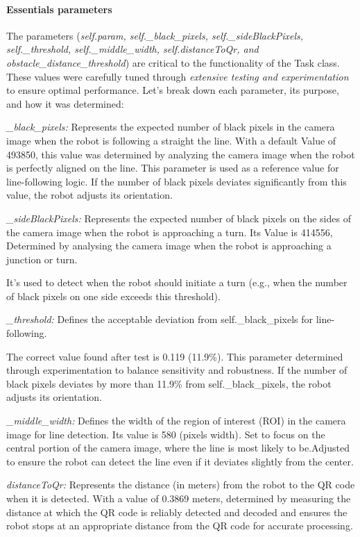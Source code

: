 \documentclass[a4paper,12pt]{extreport}
\begin{document}
\newpage

\paragraph{Essentials parameters}

The parameters (\emph{self.param, self.\_black\_pixels,
self.\_sideBlackPixels, self.\_threshold, self.\_middle\_width,
self.distanceToQr, and obstacle\_distance\_threshold}) are critical to
the functionality of the Task class. These values were carefully tuned
through \emph{extensive testing and experimentation} to ensure optimal
performance. Let's break down each parameter, its purpose, and how it
was determined:

\emph{\_black\_pixels:} Represents the expected number of black pixels
in the camera image when the robot is following a straight the line.
With a default Value of 493850, this value was determined by analyzing
the camera image when the robot is perfectly aligned on the line. This
parameter is used as a reference value for line-following logic. If the
number of black pixels deviates significantly from this value, the robot
adjusts its orientation.

\emph{\_sideBlackPixels:} Represents the expected number of black pixels
on the sides of the camera image when the robot is approaching a turn.
Its Value is 414556, Determined by analysing the camera image when the
robot is approaching a junction or turn.

It's used to detect when the robot should initiate a turn (e.g., when
the number of black pixels on one side exceeds this threshold).

\emph{\_threshold:} Defines the acceptable deviation from
self.\_black\_pixels for line-following.

The correct value found after test is 0.119 (11.9\%). This parameter
determined through experimentation to balance sensitivity and
robustness. If the number of black pixels deviates by more than 11.9\%
from self.\_black\_pixels, the robot adjusts its orientation.

\emph{\_middle\_width:} Defines the width of the region of interest
(ROI) in the camera image for line detection. Its value is 580 (pixels
width)\emph{.} Set to focus on the central portion of the camera image,
where the line is most likely to be.Adjusted to ensure the robot can
detect the line even if it deviates slightly from the center.

\emph{distanceToQr:} Represents the distance (in meters) from the robot
to the QR code when it is detected. With a value of 0.3869 meters,
determined by measuring the distance at which the QR code is reliably
detected and decoded and ensures the robot stops at an appropriate
distance from the QR code for accurate processing.
\end{document}

